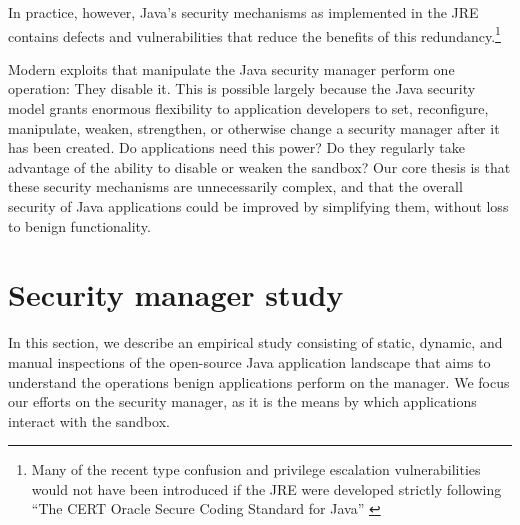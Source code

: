 \documentclass{sig-alternate}
\begin{document}
In practice, however, Java's security mechanisms as implemented
in the JRE contains defects and vulnerabilities that reduce the benefits of
this redundancy.\footnote{Many of the recent type confusion and privilege escalation vulnerabilities
would not have been introduced if the JRE were developed strictly
following ``The CERT Oracle Secure Coding Standard for Java'' \cite{long_cert_2011,svoboda_anatomy_blog_2013,svoboda_anatomy_2014}}
  
Modern exploits that manipulate the Java security manager perform one
operation: They disable it.  This is possible largely because the Java security model
grants enormous flexibility to application developers to
set, reconfigure, manipulate, weaken, strengthen, or otherwise change a security
manager after it has been created.
Do applications need this power?  Do they regularly take advantage of the
ability to disable or weaken the sandbox? %
Our core thesis is that these security mechanisms are unnecessarily
complex, and that the overall security of Java applications could be improved by
simplifying them, without loss to benign functionality.

\section{Security manager study}\label{sec:Security-Manager-Study}

In this section, we describe an empirical study consisting of static,
dynamic, and manual inspections of the open-source Java application landscape
that aims to understand the operations benign applications perform on the
manager. We focus our efforts on the security manager, as it is the
means by which applications interact with the sandbox.
\end{document}
